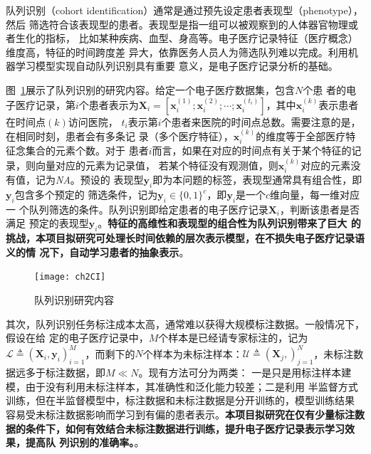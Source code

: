 队列识别（cohort identification）通常是通过预先设定患者表现型（phenotype），然后
筛选符合该表现型的患者。表现型是指一组可以被观察到的人体器官物理或者生化的指标，
比如某种疾病、血型、身高等。电子医疗记录特征（医疗概念）维度高，特征的时间跨度差
异大，依靠医务人员人为筛选队列难以完成。利用机器学习模型实现自动队列识别具有重要
意义，是电子医疗记录分析的基础。

图~\ref{fig:ch2:ci}展示了队列识别的研究内容。给定一个电子医疗数据集，包含$N$个患
者的电子医疗记录，第$i$个患者表示为$\bm X_i = [\bm x_i^{(1)}; \bm x_i^{(2)};
\cdots; \bm x_i^{(t_i)}]$，其中$\bm x_i^{(k)}$表示患者在时间点$(k)$访问医院，
$t_i$表示第$i$个患者来医院的时间点总数。需要注意的是，在相同时刻，患者会有多条记
录（多个医疗特征），$\bm x_i^{(k)}$的维度等于全部医疗特征念集合的元素个数。对于
患者$i$而言，如果在对应的时间点有关于某个特征的记录，则向量对应的元素为记录值，
若某个特征没有观测值，则$\bm x_i^{(k)}$对应的元素没有值，记为\textit{NA}。预设的
表现型$\bm y_i$即为本问题的标签，表现型通常具有组合性，即$\bm y_i$包含多个预定的
筛选条件，记为$\bm y_i \in \{0, 1\}^c$，即$\bm y_i$是一个$c$维向量，每一维对应一
个队列筛选的条件。队列识别即给定患者的电子医疗记录$\bm X_i$，判断该患者是否满足
预定的表现型$\bm y_i$。\textbf{特征的高维性和表现型的组合性为队列识别带来了巨大
的挑战，本项目拟研究可处理长时间依赖的层次表示模型，在不损失电子医疗记录语义的情
况下，自动学习患者的抽象表示}。

\begin{figure}
    \begin{small}
        \begin{center}
            \texttt{[image: ch2CI]}
        \end{center}
        \caption{队列识别研究内容}
        \label{fig:ch2:ci}
    \end{small}
\end{figure}

其次，队列识别任务标注成本太高，通常难以获得大规模标注数据。一般情况下，假设在给
定的电子医疗记录中，$M$个样本是已经请专家标注的，记为$\mathcal L \triangleq (\bm
X_i, \bm y_i)_{i=1}^M$，而剩下的$N$个样本为未标注样本：$\mathcal U \triangleq
(\bm X_j,)_{j=1}^N$，未标注数据远多于标注数据，即$M \ll N$。现有方法可分为两类：
一是只是用标注样本建模，由于没有利用未标注样本，其准确性和泛化能力较差；二是利用
半监督方式训练，但在半监督模型中，标注数据和未标注数据是分开训练的，模型训练结果
容易受未标注数据影响而学习到有偏的患者表示。\textbf{本项目拟研究在仅有少量标注数
据的条件下，如何有效结合未标注数据进行训练，提升电子医疗记录表示学习效果，提高队
列识别的准确率。}。

